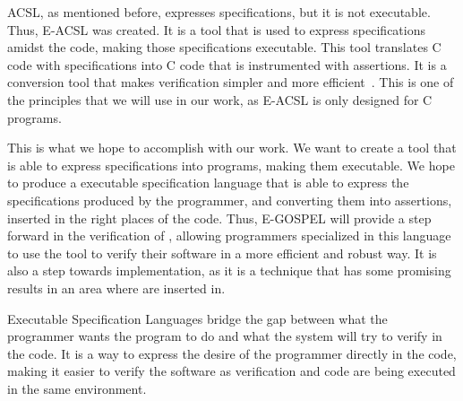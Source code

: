 ACSL, as mentioned before, expresses specifications, but it is not executable. Thus, 
E-ACSL was created. It is a tool that is used to express specifications 
amidst the code, making those specifications executable. This tool translates C code with 
specifications into C code that is instrumented with assertions. It is a conversion tool 
that makes verification simpler and more efficient~\cite{Maurica2018}. This is one of the 
principles that we will use in our work, as E-ACSL is only designed for C programs.

This is what we hope to accomplish with our work. We want to create a tool that is able to 
express specifications into \ocaml programs, making them executable. We hope to produce a 
\gospellang executable specification language that is able to express the specifications 
produced by the programmer, and converting them into assertions, inserted in the right 
places of the code. Thus, E-GOSPEL will provide a step forward in the verification of 
\ocaml, allowing programmers specialized in this language to use the tool to verify their 
software in a more efficient and robust way. It is also a step towards \monitor implementation, 
as it is a technique that has some promising results in an area where \monitors are 
inserted in.

Executable Specification Languages bridge the gap between what the programmer wants the 
program to do and what the system will try to verify in the code. It is a way to express 
the desire of the programmer directly in the code, making it easier to verify the software as 
verification and code are being executed in the same environment.